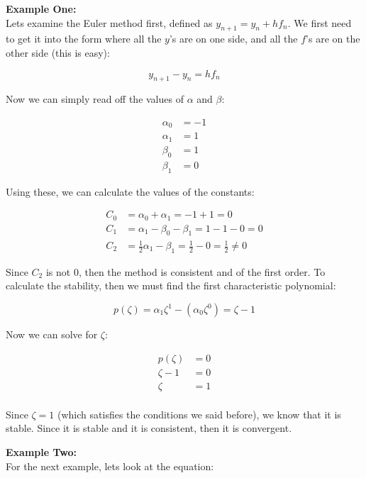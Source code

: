 \begin{description}
\item \textbf{Example One:}\\

Lets examine the Euler method first, defined as $y_{n+1} = y_n +
hf_n$. We first need to get it into the form where all the $y$'s are
on one side, and all the $f$'s are on the other side (this is easy):

\[
  y_{n+1} - y_n = hf_n
\]

Now we can simply read off the values of $\alpha$ and $\beta$:

\[
\begin{split}
  \alpha_0 &= -1\\
  \alpha_1 &= 1\\
  \beta_0 &= 1\\
  \beta_1 &= 0
\end{split}
\]

Using these, we can calculate the values of the constants:

\[
\begin{split}
C_0 &= \alpha_0 + \alpha_1 = -1 + 1 = 0\\
C_1 &= \alpha_1 - \beta_0 - \beta_1 = 1 - 1 - 0 = 0\\
C_2 &= \frac{1}{2}\alpha_1 - \beta_1 = \frac{1}{2} - 0
= \frac{1}{2} \neq 0
\end{split}
\]

Since $C_2$ is not $0$, then the method is consistent and of the first
order. To calculate the stability, then we must find the first
characteristic polynomial:

\[
  p(\zeta) = \alpha_1\zeta^1 - (\alpha_0 \zeta^0) = \zeta - 1
\]

Now we can solve for $\zeta$:

\[
\begin{split}
  p(\zeta) &= 0\\
  \zeta - 1 &= 0\\
  \zeta &= 1\\
\end{split}
\]

Since $\zeta = 1$ (which satisfies the conditions we said before), we
know that it is stable. Since it is stable and it is consistent, then
it is convergent.

\item \textbf{Example Two:}\\

For the next example, lets look at the equation:


\end{description}
